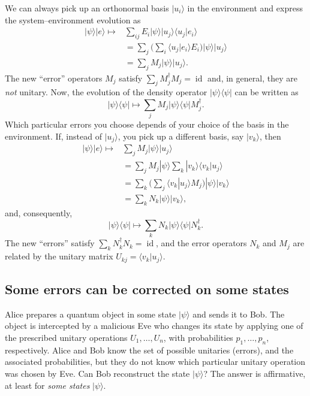 \documentclass{article}
\begin{document}
We can always pick up an orthonormal basis \(|u_i\rangle\) in the environment and express the system--environment evolution as
\[
  \begin{aligned}
    |\psi\rangle|e\rangle
    \longmapsto &\sum_{ij} E_i|\psi\rangle|u_j\rangle\langle u_j|e_i\rangle
    \\&= \sum_{j}\Big( \sum_i \langle u_j|e_i\rangle E_i\Big)|\psi\rangle|u_j\rangle
    \\&= \sum_j M_j|\psi\rangle|u_j\rangle.
  \end{aligned}
\]
The new ``error'' operators \(M_j\) satisfy \(\sum_j M_j^\dagger M_j =\operatorname{id}\) and, in general, they are \emph{not} unitary.
Now, the evolution of the density operator \(|\psi\rangle\langle\psi|\) can be written as
\[
  |\psi\rangle\langle\psi|\longmapsto \sum_j M_j|\psi\rangle\langle\psi| M_j^\dagger.
\]
Which particular errors you choose depends of your choice of the basis in the environment.
If, instead of \(|u_j\rangle\), you pick up a different basis, say \(|v_k\rangle\), then
\[
  \begin{aligned}
    |\psi\rangle|e\rangle
    \longmapsto &\sum_j M_j|\psi\rangle|u_j\rangle
  \\&= \sum_j M_j |\psi\rangle\sum_k|v_k\rangle\langle v_k|u_j\rangle
  \\&= \sum_k \Big(\sum_j \langle v_k|u_j\rangle M_j \Big)|\psi\rangle|v_k\rangle
  \\&= \sum_k N_k|\psi\rangle|v_k\rangle,
  \end{aligned}
\]
and, consequently,
\[
  |\psi\rangle\langle\psi|\longmapsto \sum_k N_k|\psi\rangle\langle\psi| N_k^\dagger.
\]
The new ``errors'' satisfy \(\sum_k N_k^\dagger N_k = \operatorname{id}\), and the error operators \(N_k\) and \(M_j\) are related by the unitary matrix \(U_{kj}=\langle v_k|u_j\rangle\).

\hypertarget{some-errors-can-be-corrected-on-some-states}{%
\subsection{Some errors can be corrected on some states}\label{some-errors-can-be-corrected-on-some-states}}

Alice prepares a quantum object in some state \(|\psi\rangle\) and sends it to Bob.
The object is intercepted by a malicious Eve who changes its state by applying one of the prescribed unitary operations \(U_1,\ldots, U_n\), with probabilities \(p_1,\ldots, p_n\), respectively.
Alice and Bob know the set of possible unitaries (errors), and the associated probabilities, but they do not know which particular unitary operation was chosen by Eve.
Can Bob reconstruct the state \(|\psi\rangle\)?
The answer is affirmative, at least for \emph{some states} \(|\psi\rangle\).
\end{document}

